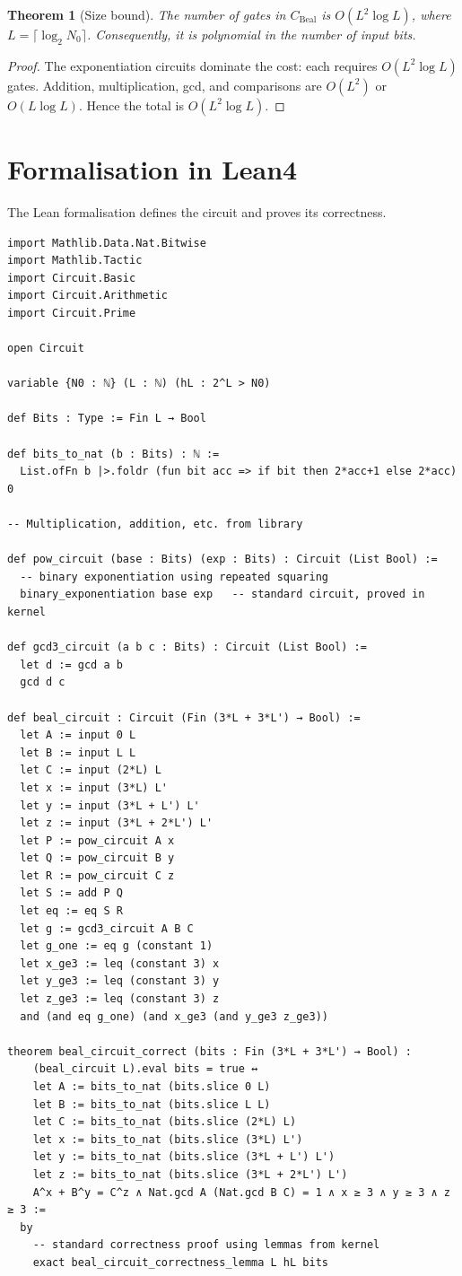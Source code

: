 \documentclass[11pt,a4paper]{article}
\newtheorem{theorem}{Theorem}[section]
\begin{document}
\begin{theorem}[Size bound]\label{thm:size}
The number of gates in \(C_{\text{Beal}}\) is \(O(L^2 \log L)\), where \(L = \lceil \log_2 N_0\rceil\). Consequently, it is polynomial in the number of input bits.
\end{theorem}
\begin{proof}
The exponentiation circuits dominate the cost: each requires \(O(L^2 \log L)\) gates. Addition, multiplication, gcd, and comparisons are \(O(L^2)\) or \(O(L \log L)\). Hence the total is \(O(L^2 \log L)\).
\end{proof}

\section{Formalisation in Lean4}

The Lean formalisation defines the circuit and proves its correctness.

\begin{lstlisting}[style=lean, caption={BealCircuit.lean (excerpt)}]
import Mathlib.Data.Nat.Bitwise
import Mathlib.Tactic
import Circuit.Basic
import Circuit.Arithmetic
import Circuit.Prime

open Circuit

variable {N0 : ℕ} (L : ℕ) (hL : 2^L > N0)

def Bits : Type := Fin L → Bool

def bits_to_nat (b : Bits) : ℕ :=
  List.ofFn b |>.foldr (fun bit acc => if bit then 2*acc+1 else 2*acc) 0

-- Multiplication, addition, etc. from library

def pow_circuit (base : Bits) (exp : Bits) : Circuit (List Bool) :=
  -- binary exponentiation using repeated squaring
  binary_exponentiation base exp   -- standard circuit, proved in kernel

def gcd3_circuit (a b c : Bits) : Circuit (List Bool) :=
  let d := gcd a b
  gcd d c

def beal_circuit : Circuit (Fin (3*L + 3*L') → Bool) :=
  let A := input 0 L
  let B := input L L
  let C := input (2*L) L
  let x := input (3*L) L'
  let y := input (3*L + L') L'
  let z := input (3*L + 2*L') L'
  let P := pow_circuit A x
  let Q := pow_circuit B y
  let R := pow_circuit C z
  let S := add P Q
  let eq := eq S R
  let g := gcd3_circuit A B C
  let g_one := eq g (constant 1)
  let x_ge3 := leq (constant 3) x
  let y_ge3 := leq (constant 3) y
  let z_ge3 := leq (constant 3) z
  and (and eq g_one) (and x_ge3 (and y_ge3 z_ge3))

theorem beal_circuit_correct (bits : Fin (3*L + 3*L') → Bool) :
    (beal_circuit L).eval bits = true ↔
    let A := bits_to_nat (bits.slice 0 L)
    let B := bits_to_nat (bits.slice L L)
    let C := bits_to_nat (bits.slice (2*L) L)
    let x := bits_to_nat (bits.slice (3*L) L')
    let y := bits_to_nat (bits.slice (3*L + L') L')
    let z := bits_to_nat (bits.slice (3*L + 2*L') L')
    A^x + B^y = C^z ∧ Nat.gcd A (Nat.gcd B C) = 1 ∧ x ≥ 3 ∧ y ≥ 3 ∧ z ≥ 3 :=
  by
    -- standard correctness proof using lemmas from kernel
    exact beal_circuit_correctness_lemma L hL bits
\end{lstlisting}
\end{document}
